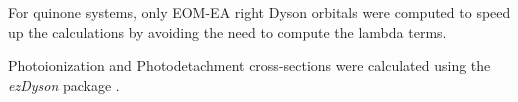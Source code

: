 For quinone systems, only EOM-EA right Dyson orbitals were computed to speed up the calculations by avoiding the need to compute the lambda terms.

Photoionization and Photodetachment cross-sections were calculated using the \textit{ezDyson} package \cite{gozem2022ezspectra,gozem2015photoionization}.






\cleardoublepage


